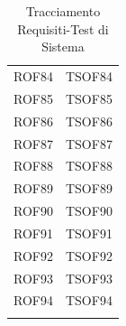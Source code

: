 \documentclass[../PianoDiQualifica_v4.0.0.tex]{subfiles}
\begin{document}
\begin{longtable}[c] { >{\centering\arraybackslash}p{3cm} >{\centering\arraybackslash}p{3cm}}
			\addlinespace[0.3em]
			\midrule
			\addlinespace[0.3em]
			ROF84 & TSOF84 \\
			\addlinespace[0.3em]
			\midrule
			\addlinespace[0.3em]
			ROF85 & TSOF85 \\
			\addlinespace[0.3em]
			\midrule
			\addlinespace[0.3em]
			ROF86 & TSOF86 \\
			\addlinespace[0.3em]
			\midrule
			\addlinespace[0.3em]
			ROF87 & TSOF87 \\
			\addlinespace[0.3em]
			\midrule
			\addlinespace[0.3em]
			ROF88 & TSOF88 \\
			\addlinespace[0.3em]
			\midrule
			\addlinespace[0.3em]
			ROF89 & TSOF89 \\
			\addlinespace[0.3em]
			\midrule
			\addlinespace[0.3em]
			ROF90 & TSOF90 \\
			\addlinespace[0.3em]
			\midrule
			\addlinespace[0.3em]
			ROF91 & TSOF91 \\
			\addlinespace[0.3em]
			\midrule
			\addlinespace[0.3em]
			ROF92 & TSOF92 \\
			\addlinespace[0.3em]
			\midrule
			\addlinespace[0.3em]
			ROF93 & TSOF93 \\
			\addlinespace[0.3em]
			\midrule
			\addlinespace[0.3em]
			ROF94 & TSOF94 \\
			\bottomrule
			\caption{Tracciamento Requisiti-Test di Sistema}
	\end{longtable}

	\newpage
\end{document}
